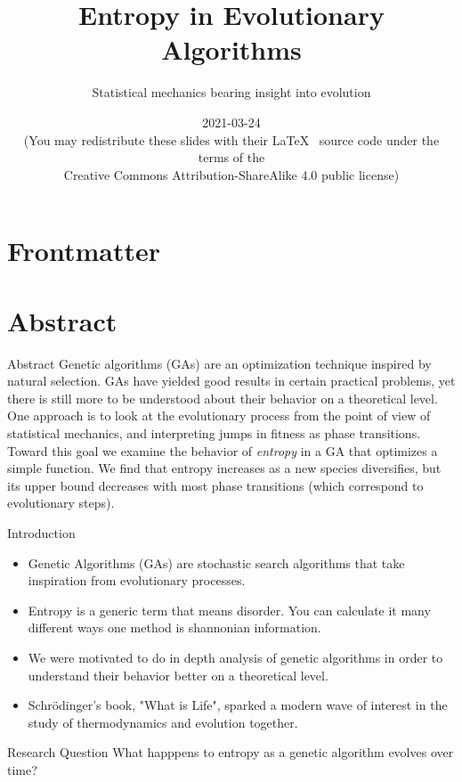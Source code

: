 \documentclass[10pt,aspectratio=169]{beamer}
\title{Entropy in Evolutionary Algorithms}
\subtitle{Statistical mechanics bearing insight into evolution}
\date{2021-03-24 \\
  \smallskip
      {\smaller[4] (You may redistribute these slides with their \LaTeX\
        \vspace{-0.1cm}
        source code under the terms of the \\
        Creative Commons Attribution-ShareAlike 4.0 public license)}
}
\begin{document}
\section*{Frontmatter}

\begin{frame}
  \maketitle
\end{frame}

\section{Abstract}

\begin{frame}{Abstract}
	Genetic algorithms (GAs) are an optimization technique inspired by
	natural selection. GAs have yielded good results in certain practical
	problems, yet there is still more to be understood about their
	behavior on a theoretical level. One approach is to look at the
	evolutionary process from the point of view of statistical mechanics,
	and interpreting jumps in fitness as phase transitions. Toward this
	goal we examine the behavior of \emph{entropy} in a GA that optimizes
	a simple function.  We find that entropy increases as a new species
	diversifies, but its upper bound decreases with most phase
	transitions (which correspond to evolutionary steps).
\end{frame}

\begin{frame}{Introduction}
	\begin{itemize}
		\item Genetic Algorithms (GAs) are stochastic search algorithms that take inspiration from evolutionary processes. 
		\item Entropy is a generic term that means disorder. You can calculate it many different ways one method is shannonian information.
		\item We were motivated to do in depth analysis of genetic algorithms in order to understand their behavior better on a theoretical level.
		\item Schrödinger's book, "What is Life", sparked a modern wave of interest in the study of thermodynamics and evolution together.
	\end{itemize}
\end{frame}

\begin{frame}{Research Question}
		What happpens to entropy as a genetic algorithm
                evolves over time?
\end{frame}
\end{document}
